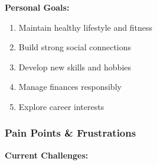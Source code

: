 \textbf{Personal Goals:}
\begin{enumerate}
    \item Maintain healthy lifestyle and fitness
    \item Build strong social connections
    \item Develop new skills and hobbies
    \item Manage finances responsibly
    \item Explore career interests
\end{enumerate}

\subsubsection{Pain Points \& Frustrations}

\textbf{Current Challenges:}

